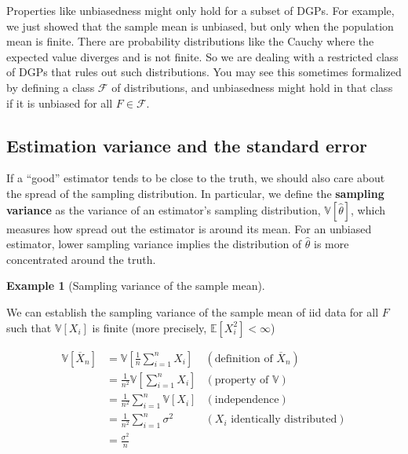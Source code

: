 \documentclass[
  letterpaper,
  DIV=11,
  numbers=noendperiod]{scrreprt}
\newcommand{\E}{\mathbb{E}}
\newcommand{\V}{\mathbb{V}}
\newcommand{\Xbar}{\overline{X}}
\theoremstyle{definition}
\newtheorem{example}{Example}[chapter]
\theoremstyle{definition}
\theoremstyle{plain}
\theoremstyle{remark}
\begin{document}
\begin{tcolorbox}[enhanced jigsaw, colframe=quarto-callout-warning-color-frame, rightrule=.15mm, colback=white, breakable, opacityback=0, coltitle=black, opacitybacktitle=0.6, arc=.35mm, left=2mm, leftrule=.75mm, toptitle=1mm, colbacktitle=quarto-callout-warning-color!10!white, titlerule=0mm, title=\textcolor{quarto-callout-warning-color}{\faExclamationTriangle}\hspace{0.5em}{Warning}, bottomrule=.15mm, bottomtitle=1mm, toprule=.15mm]

Properties like unbiasedness might only hold for a subset of DGPs. For
example, we just showed that the sample mean is unbiased, but only when
the population mean is finite. There are probability distributions like
the Cauchy where the expected value diverges and is not finite. So we
are dealing with a restricted class of DGPs that rules out such
distributions. You may see this sometimes formalized by defining a class
\(\mathcal{F}\) of distributions, and unbiasedness might hold in that
class if it is unbiased for all \(F \in \mathcal{F}\).

\end{tcolorbox}

\hypertarget{estimation-variance-and-the-standard-error}{%
\subsection{Estimation variance and the standard
error}\label{estimation-variance-and-the-standard-error}}

If a ``good'' estimator tends to be close to the truth, we should also
care about the spread of the sampling distribution. In particular, we
define the \textbf{sampling variance} as the variance of an estimator's
sampling distribution, \(\V[\widehat{\theta}]\), which measures how
spread out the estimator is around its mean. For an unbiased estimator,
lower sampling variance implies the distribution of \(\widehat{\theta}\)
is more concentrated around the truth.

\begin{example}[Sampling variance of the sample
mean]\protect\hypertarget{exm-mean-var}{}\label{exm-mean-var}

We can establish the sampling variance of the sample mean of iid data
for all \(F\) such that \(\V[X_i]\) is finite (more precisely,
\(\E[X_i^2] < \infty\))

\[\begin{aligned}
  \V\left[ \Xbar_n \right] &= \V\left[ \frac{1}{n} \sum_{i=1}^n X_i \right] & (\text{definition of } \Xbar_n) \\
                           &= \frac{1}{n^2} \V\left[ \sum_{i=1}^n X_i \right] & (\text{property of } \V) \\
                           &= \frac{1}{n^2} \sum_{i=1}^n \V[X_i] & (\text{independence}) \\
                           &= \frac{1}{n^2} \sum_{i=1}^n \sigma^2 & (X_i \text{ identically distributed}) \\
                           &= \frac{\sigma^2}{n}
\end{aligned}\]

\end{example}
\end{document}
